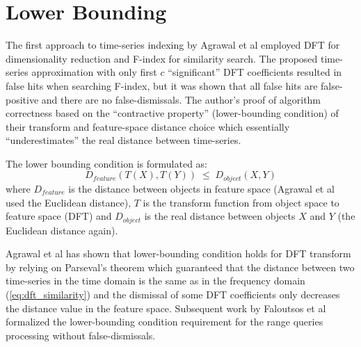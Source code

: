\section{Lower Bounding}
The first approach to time-series indexing by Agrawal et al \cite{citeulike:3973409} employed DFT for dimensionality reduction and F-index for similarity search. The proposed time-series approximation with only first $c$ ``significant'' DFT coefficients resulted in false hits when searching F-index, but it was shown that all false hits are false-positive and there are no false-dismissals. The author's proof of algorithm correctness based on the ``contractive property'' (lower-bounding condition) of their transform and feature-space distance choice which essentially ``underestimates'' the real distance between time-series.

The lower bounding condition is formulated as:
\begin{equation}
D_{feature}(T(X),T(Y)) \; \leq \; D_{object}(X,Y) 
\label{eq:bounding}
\end{equation}
where $D_{feature}$ is the distance between objects in feature space (Agrawal et al used the Euclidean distance), $T$ is the transform function from object space to feature space (DFT) and $D_{object}$ is the real distance between objects $X$ and $Y$ (the Euclidean distance again). 

Agrawal et al has shown that lower-bounding condition holds for DFT transform by relying on Parseval's theorem which guaranteed that the distance between two time-series in the time domain is the same as in the frequency domain (\ref{eq:dft_similarity}) and the dismissal of some DFT coefficients only decreases the distance value in the feature space. Subsequent work by Faloutsos et al \cite{citeulike:825581} formalized the lower-bounding condition requirement for the range queries processing without false-dismissals.